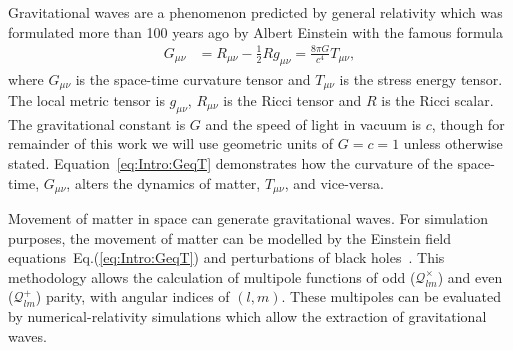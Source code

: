 \documentclass[../Thesis.tex]{subfiles}
\begin{document}
    Gravitational waves are a phenomenon predicted by general relativity which was formulated more than 100 years ago by Albert Einstein with the famous formula
    \begin{align}
        G_{\mu\nu} & = R_{\mu\nu} - \frac{1}{2}R  g_{\mu\nu}  =  \frac{8\pi G}{c^4} T_{\mu\nu}, \label{eq:Intro:GeqT}
    \end{align}
    where $G_{\mu\nu}$ is the space-time curvature tensor and $T_{\mu\nu}$ is the stress energy tensor. The local metric tensor is $g_{\mu\nu}$, $R_{\mu\nu}$ is the Ricci tensor and $R$ is the Ricci scalar. 
    The gravitational constant is $G$ and the speed of light in vacuum is $c$, though for remainder of this work we will use geometric units of $G=c=1$ unless otherwise stated. 
    Equation~\ref{eq:Intro:GeqT} demonstrates how the curvature of the space-time, $G_{\mu\nu}$, alters the dynamics of matter, $T_{\mu\nu}$, and vice-versa. \par
    Movement of matter in space can generate gravitational waves.
    For simulation purposes, the movement of matter can be modelled by the Einstein field equations~Eq.(\ref{eq:Intro:GeqT}) and perturbations of black holes~\cite[e.g.,][]{Moncrief1974,Abrahams1996,Andrade1999,Nagar2005}.
    This methodology allows the calculation of multipole functions of odd ($\mathcal{Q}^\times_{lm}$) and even ($\mathcal{Q}^+_{lm}$) parity, with angular indices of $(l,m)$.
    These multipoles can be evaluated by numerical-relativity simulations which allow the extraction of gravitational waves.
\end{document}
